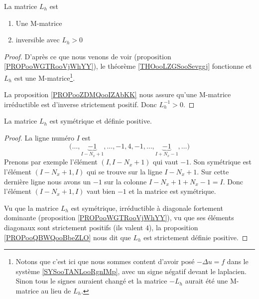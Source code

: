 \begin{corollary}       \label{CORooZFBXooVGuhQD}
    La matrice \( L_h\) est
    \begin{enumerate}
        \item
            Une M-matrice
        \item
            inversible avec \( L_{h}>0\)
    \end{enumerate}
\end{corollary}

\begin{proof}
    D'après ce que nous venons de voir (proposition \ref{PROPooWGTRooVjWhYY}), le théorème \ref{THOooLZGSooSevggj} fonctionne et \( L_h\) est une M-matrice\footnote{Notons que c'est ici que nous sommes content d'avoir posé \( -\Delta u=f\) dans le système \eqref{SYSooTANLooRgnIMp}, avec un signe négatif devant le laplacien. Sinon tous le signes auraient changé et la matrice \( -L_h\) aurait été une M-matrice au lieu de \( L_h\).}.

    La proposition \ref{PROPooZDMQooIZAbKK} nous assure qu'une M-matrice irréductible est d'inverse strictement positif. Donc \( L_h^{-1}>0\).
\end{proof}

\begin{proposition}
    La matrice \( L_h\) est symétrique et définie positive.
\end{proposition}

\begin{proof}
    La ligne numéro \( I\) est 
    \begin{equation}
        \big( \ldots ,\underbrace{-1}_{I-N_x+1},\ldots,-1,4,-1,\ldots,\underbrace{-1}_{I+N_x-1},\ldots \big)
    \end{equation}
    Prenons par exemple l'élément \( (I,I-N_x+1)\) qui vaut \( -1\). Son symétrique est l'élément \( (I-N_x+1,I)\) qui se trouve sur la ligne \( I-N_x+1\). Sur cette dernière ligne nous avons un \( -1\) sur la colonne \( I-N_x+1+N_x-1=I\). Donc l'élément \( (I-N_x+1,I)\) vaut bien \( -1\) et la matrice est symétrique.

    Vu que la matrice \( L_h\) est symétrique, irréductible à diagonale fortement dominante (proposition \ref{PROPooWGTRooVjWhYY}), vu que ses éléments diagonaux sont strictement positifs (ils valent \( 4\)), la proposition \ref{PROPooQBWQooBbeZLO} nous dit que \( L_h\) est strictement définie positive.
\end{proof}

